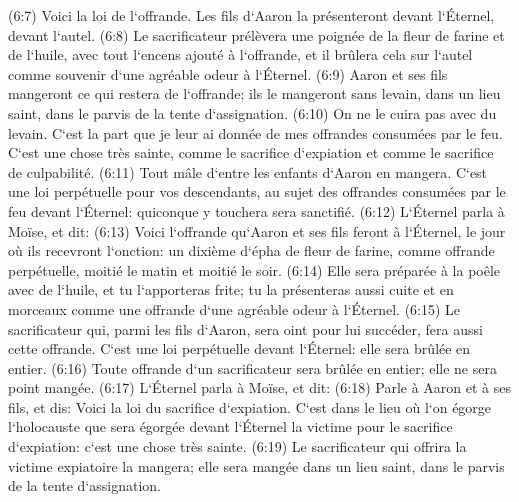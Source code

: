 \verse (6:7) Voici la loi de l`offrande. Les fils d`Aaron la présenteront devant l`Éternel, devant l`autel. 
\verse (6:8) Le sacrificateur prélèvera une poignée de la fleur de farine et de l`huile, avec tout l`encens ajouté à l`offrande, et il brûlera cela sur l`autel comme souvenir d`une agréable odeur à l`Éternel. 
\verse (6:9) Aaron et ses fils mangeront ce qui restera de l`offrande; ils le mangeront sans levain, dans un lieu saint, dans le parvis de la tente d`assignation. 
\verse (6:10) On ne le cuira pas avec du levain. C`est la part que je leur ai donnée de mes offrandes consumées par le feu. C`est une chose très sainte, comme le sacrifice d`expiation et comme le sacrifice de culpabilité. 
\verse (6:11) Tout mâle d`entre les enfants d`Aaron en mangera. C`est une loi perpétuelle pour vos descendants, au sujet des offrandes consumées par le feu devant l`Éternel: quiconque y touchera sera sanctifié. 
\verse (6:12) L`Éternel parla à Moïse, et dit: 
\verse (6:13) Voici l`offrande qu`Aaron et ses fils feront à l`Éternel, le jour où ils recevront l`onction: un dixième d`épha de fleur de farine, comme offrande perpétuelle, moitié le matin et moitié le soir. 
\verse (6:14) Elle sera préparée à la poêle avec de l`huile, et tu l`apporteras frite; tu la présenteras aussi cuite et en morceaux comme une offrande d`une agréable odeur à l`Éternel. 
\verse (6:15) Le sacrificateur qui, parmi les fils d`Aaron, sera oint pour lui succéder, fera aussi cette offrande. C`est une loi perpétuelle devant l`Éternel: elle sera brûlée en entier. 
\verse (6:16) Toute offrande d`un sacrificateur sera brûlée en entier; elle ne sera point mangée. 
\verse (6:17) L`Éternel parla à Moïse, et dit: 
\verse (6:18) Parle à Aaron et à ses fils, et dis: Voici la loi du sacrifice d`expiation. C`est dans le lieu où l`on égorge l`holocauste que sera égorgée devant l`Éternel la victime pour le sacrifice d`expiation: c`est une chose très sainte. 
\verse (6:19) Le sacrificateur qui offrira la victime expiatoire la mangera; elle sera mangée dans un lieu saint, dans le parvis de la tente d`assignation. 
